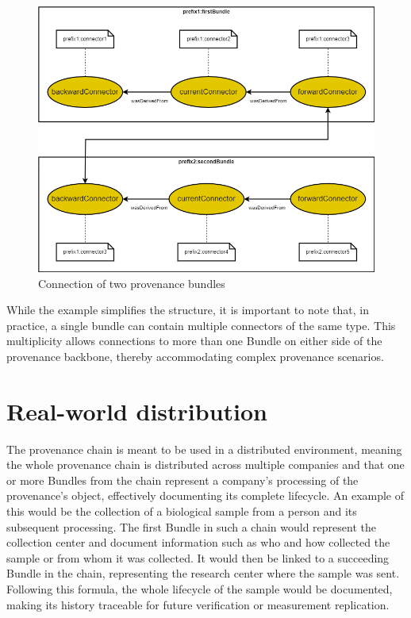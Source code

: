 \documentclass[
  digital,     %
  oneside,     %
  nosansbold,  %
  nocolorbold, %
  lof,         %
  lot,         %
]{fithesis4}
\begin{document}
\begin{figure}[htbp]
  \begin{center}
    \includegraphics[width=12.5cm]{fithesis/images/backbone.png}
  \end{center}
  \caption{Connection of two provenance bundles}
  \label{fig:bundleconnection}
\end{figure}

While the example simplifies the structure, it is important to note that, in practice, a single bundle can contain multiple connectors of the same type. This multiplicity allows connections to more than one Bundle on either side of the provenance backbone, thereby accommodating complex provenance scenarios.
\shorthandon{-}

\section{Real-world distribution}
The provenance chain is meant to be used in a distributed environment, meaning the whole provenance chain is distributed across multiple companies and that one or more Bundles from the chain represent a company's processing of the provenance's object, effectively documenting its complete lifecycle. An example of this would be the collection of a biological sample from a person and its subsequent processing. The first Bundle in such a chain would represent the collection center and document information such as who and how collected the sample or from whom it was collected. It would then be linked to a succeeding Bundle in the chain, representing the research center where the sample was sent. Following this formula, the whole lifecycle of the sample would be documented, making its history traceable for future verification or measurement replication.
\end{document}
